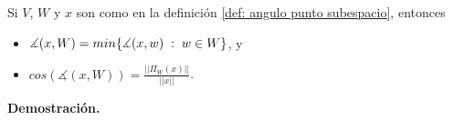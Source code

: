 \begin{prop}
\label{prop: algunos hechos sobre el angulo entre un vector y un subespacio}
Si $V$, $W$ y $x$ son como en la definición 
\ref{def: angulo punto subespacio}, entonces

\begin{itemize}
\item 
$\measuredangle (x, W) = min \{ \measuredangle(x,w) \hspace{0.1cm} :
 \hspace{0.1cm} w \in W \}$, y

\item $cos \left( \measuredangle (x, W) \right) = \frac{|| \Pi_{W}(x) ||}{||x||}$.
\end{itemize}


\end{prop}
\noindent
\textbf{Demostración.}
